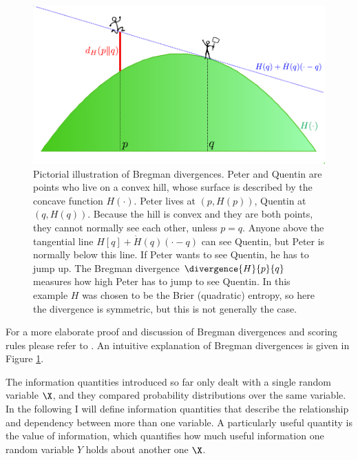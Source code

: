\begin{figure}[t]
\begin{center}
	\includegraphics[width=0.8\columnwidth]{figs/embeddings/Bregman}
\end{center}
\caption[Pictorial illustration of Bregman divergences]{Pictorial illustration of Bregman divergences. Peter and Quentin are points who live on a convex hill, whose surface is described by the concave function $H(\cdot)$. Peter lives at $(p,H(p))$, Quentin at $(q,H(q))$. Because the hill is convex and they are both points, they cannot normally see each other, unless $p=q$. Anyone above the tangential line $H[q] + \dot{H}(q)(\cdot-q)$ can see Quentin, but Peter is normally below this line. If Peter wants to see Quentin, he has to jump up. The Bregman divergence $\divergence{H}{p}{q}$ measures how high Peter has to jump to see Quentin. In this example $H$ was chosen to be the Brier (quadratic) entropy, so here the divergence is symmetric, but this is not generally the case.\label{fig:Bregman}}
\end{figure}

For a more elaborate proof and discussion of Bregman divergences and scoring rules please refer to \citep{Amari2010,Dawid2007}. An intuitive explanation of Bregman divergences is given in Figure \ref{fig:Bregman}.

The information quantities introduced so far only dealt with a single random variable $\X$, and they compared probability distributions over the same variable. In the following I will define information quantities that describe the relationship and dependency between more than one variable. A particularly useful quantity is the value of information, which quantifies how much useful information one random variable $Y$ holds about another one $\X$.

